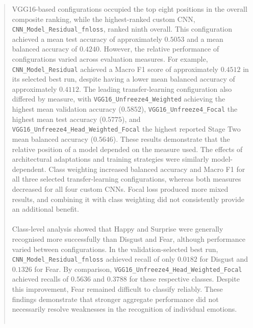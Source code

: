\documentclass[12pt, a4paper]{report}
\begin{document}
\begin{abstract}
		VGG16-based configurations occupied the top eight positions in the overall composite ranking, while the highest-ranked custom CNN, \texttt{CNN\_Model\_Residual\_fnloss}, ranked ninth overall. This configuration achieved a mean test accuracy of approximately $0.5053$ and a mean balanced accuracy of $0.4240$. However, the relative performance of configurations varied across evaluation measures. For example, \texttt{CNN\_Model\_Residual} achieved a Macro F1 score of approximately $0.4512$ in its selected best run, despite having a lower mean balanced accuracy of approximately $0.4112$. The leading transfer-learning configuration also differed by measure, with \texttt{VGG16\_Unfreeze4\_Weighted} achieving the highest mean validation accuracy ($0.5852$), \texttt{VGG16\_Unfreeze4\_Focal} the highest mean test accuracy ($0.5775$), and \texttt{VGG16\_Unfreeze4\_Head\_Weighted\_Focal} the highest reported Stage Two mean balanced accuracy ($0.5646$). These results demonstrate that the relative position of a model depended on the measure used. The effects of architectural adaptations and training strategies were similarly model-dependent. Class weighting increased balanced accuracy and Macro F1 for all three selected transfer-learning configurations, whereas both measures decreased for all four custom CNNs. Focal loss produced more mixed results, and combining it with class weighting did not consistently provide an additional benefit.\\\\
		Class-level analysis showed that Happy and Surprise were generally recognised more successfully than Disgust and Fear, although performance varied between configurations. In the validation-selected best run, \texttt{CNN\_Model\_Residual\_fnloss} achieved recall of only $0.0182$ for Disgust and $0.1326$ for Fear. By comparison, \texttt{VGG16\_Unfreeze4\_Head\_Weighted\_Focal} achieved recalls of $0.5636$ and $0.3788$ for these respective classes. Despite this improvement, Fear remained difficult to classify reliably. These findings demonstrate that stronger aggregate performance did not necessarily resolve weaknesses in the recognition of individual emotions.\\\\

\end{abstract}
\end{document}
